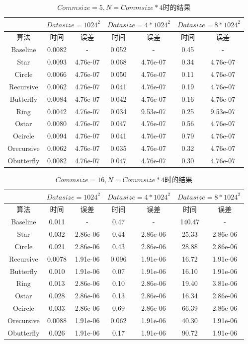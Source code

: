 \documentclass{article}
\begin{document}
\begin{table}[H]
	\centering
	\begin{tabular}{c|cc|cc|cc}
		& \multicolumn{2}{|c|}{$Datasize=1024^2$}  &\multicolumn{2}{|c|}{$Datasize=4*1024^2$}&\multicolumn{2}{c}{$Datasize=8*1024^2$}\\\hline
		算法 &时间 &误差 &时间 &误差 &时间 &误差\\ \hline
		Baseline &0.0082&- &0.052&- &0.45&-\\
		Star& 0.0093&4.76e-07&0.068&4.76e-07&0.34&4.76e-07\\
		Circle &0.0066&4.76e-07&0.050&4.76e-07&0.11&4.76e-07\\
		Recursive &0.0062&4.76e-07&0.041&4.76e-07&0.19&4.76e-07\\
		Butterfly &0.0084&4.76e-07&0.042&4.76e-07&0.16&4.76e-07\\
		Ring &0.0042&4.76e-07&0.034&9.53e-07&0.25&9.53e-07\\
		Ostar &0.0080&4.76e-07&0.047&4.76e-07&0.56&4.76e-07\\
		Ocircle &0.0094&4.76e-07&0.041&4.76e-07&0.79&4.76e-07\\
		Orecursive &0.0062&4.76e-07&0.035&4.76e-07&0.32&4.76e-07\\
		Obutterfly &0.0082&4.76e-07&0.047&4.76e-07&0.30&4.76e-07
	\end{tabular}
	\caption{$Commsize = 5, N = Commsize*4$时的结果}
\end{table}
\begin{table}[H]
	\centering
	\begin{tabular}{c|cc|cc|cc}
		& \multicolumn{2}{|c|}{$Datasize=1024^2$}  &\multicolumn{2}{|c|}{$Datasize=4*1024^2$}&\multicolumn{2}{c}{$Datasize=8*1024^2$}\\\hline
		算法 &时间 &误差 &时间 &误差 &时间 &误差\\ \hline
		Baseline &0.011&-&0.47&-&140.47&-\\
		Star& 0.032&2.86e-06&0.44&2.86e-06&25.33&2.86e-06\\
		Circle &0.021&2.86e-06&0.43&2.86e-06&28.88&2.86e-06\\
		Recursive &0.0078&1.91e-06&0.096&1.91e-06&16.72&1.91e-06\\
		Butterfly &0.010&1.91e-06&0.07&1.91e-06&16.10&1.91e-06\\
		Ring &0.013&2.86e-06&0.10&2.86e-06&19.40&3.81e-06\\
		Ostar &0.028&2.86e-06&0.13&2.86e-06&16.34&2.86e-06\\
		Ocircle &0.033&2.86e-06&0.69&2.86e-06&66.39&2.86e-06\\
		Orecursive &0.0088&1.91e-06&0.062&1.91e-06&40.30&1.91e-06\\
		Obutterfly &0.026&1.91e-06&0.17&1.91e-06&90.72&1.91e-06
	\end{tabular}
	\caption{$Commsize = 16, N = Commsize*4$时的结果}
\end{table}
\end{document}
